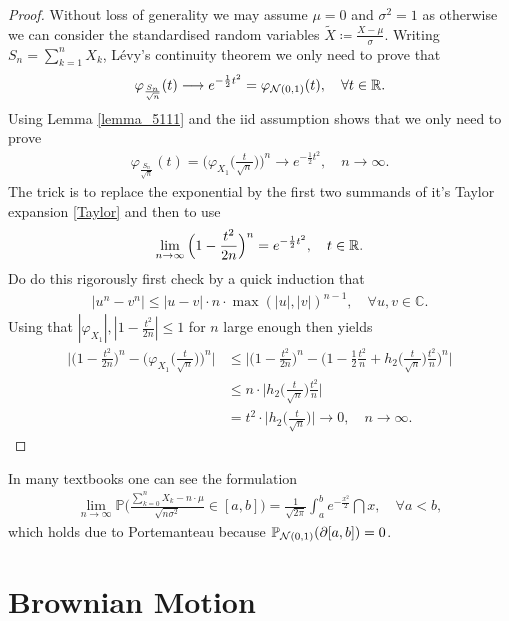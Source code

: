 \begin{proof}[Proof]
	Without loss of generality we may assume $\mu=0$ and $\sigma^2=1$ as otherwise we can consider the standardised random variables $\tilde{X} \coloneqq \frac{X-\mu}{\sigma}$. Writing $S_n=\sum_{k=1}^n X_k$, L\'{e}vy's continuity theorem we only need to prove that
	\begin{align*}
		\varphi_{\frac{S_n}{\sqrt{n}}}(t) \longrightarrow e^{-\frac{1}{2}t^2} = \varphi_{\mathcal{N}(0,1)}(t),\quad \forall t \in \mathbb{R}.
	\end{align*}
	Using Lemma \ref{lemma_5111} and the iid assumption shows that we only need to prove
	\begin{align*}
		\varphi_{\frac{S_n}{\sqrt{n}}}(t) = \Big( \varphi_{X_1}\Big( \frac{t}{\sqrt{n}}\Big) \Big)^n \longrightarrow e^{-\frac{1}{2}t^2}, \quad n \to \infty.
	\end{align*}	
The trick is to replace the exponential by the first two summands of it's Taylor expansion \eqref{Taylor} and then to use
\begin{align*}
	\lim_{n\to\infty}\Big(1-  \frac{t^2}{2n}\Big)^{n}= e^{-\frac{1}{2}t^2},\quad t\in\mathbb{R}.
\end{align*}
Do do this rigorously first check by a quick induction that
	\begin{align*}
		\lvert u^n - v^n \rvert \leq \lvert u - v \rvert \cdot n \cdot \max(\lvert u \rvert, \lvert v \rvert )^{n-1}, \quad\forall u,v\in\mathbb{C}.
	\end{align*}
	Using that $|\varphi_{X_1}|, |1 - \frac{t^2}{2n}|\leq 1$ for $n$ large enough then yields
	\begin{align*}
		\bigg\lvert \Big( 1 - \frac{t^2}{2n} \Big)^n - \Big(\varphi_{ X_1}\big(\frac{t}{\sqrt{n}}\big)\Big)^n \bigg\rvert 
		&\leq \bigg\lvert \Big( 1 - \frac{t^2}{2n} \Big)^n - \Big( 1 - \frac{1}{2} \frac{t^2}{n} + h_2\Big( \frac{t}{\sqrt{n}} \Big) \frac{t^2}{n} \Big)^n \bigg\rvert \\
		&\leq n \cdot \Big\lvert h_2 \Big( \frac{t}{\sqrt{n}}\Big)  \frac{t^2}{n} \Big\rvert \\
		&= t^2 \cdot \Big\lvert h_2 \Big( \frac{t}{\sqrt{n}} \Big) \Big\rvert
		\rightarrow 0,\quad n \to \infty.
	\end{align*}
\end{proof}
In many textbooks one can see the formulation
	\begin{align*}
		\lim_{n\to\infty}\mathbb{P} \bigg( \frac{\sum_{k=0}^n X_k - n \cdot \mu}{\sqrt{n \sigma^2}} \in [a,b] \bigg)= \frac{1}{\sqrt{2\pi}} \int_a^b e^{- \frac{x^2}{2}} \dint x, \quad \forall a<b,
	\end{align*}
	which holds due to Portemanteau because $\mathbb{P}_{\mathcal{N}(0,1)}( \partial [a,b]) = 0$.


\chapter{Brownian Motion}\label{sec:BM}

